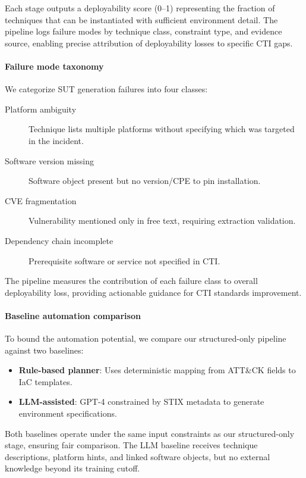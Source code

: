 \documentclass[sigconf,anonymous,review]{acmart}
\begin{document}
Each stage outputs a deployability score (0--1) representing the fraction of techniques that can be instantiated with sufficient environment detail. The pipeline logs failure modes by technique class, constraint type, and evidence source, enabling precise attribution of deployability losses to specific CTI gaps.

\paragraph{Failure mode taxonomy}

We categorize SUT generation failures into four classes:

\begin{description}
\item[Platform ambiguity] Technique lists multiple platforms without specifying which was targeted in the incident.
\item[Software version missing] Software object present but no version/CPE to pin installation.
\item[CVE fragmentation] Vulnerability mentioned only in free text, requiring extraction validation.
\item[Dependency chain incomplete] Prerequisite software or service not specified in CTI.
\end{description}

The pipeline measures the contribution of each failure class to overall deployability loss, providing actionable guidance for CTI standards improvement.

\paragraph{Baseline automation comparison}

To bound the automation potential, we compare our structured-only pipeline against two baselines:

\begin{itemize}
\item \textbf{Rule-based planner}: Uses deterministic mapping from ATT\&CK fields to IaC templates.
\item \textbf{LLM-assisted}: GPT-4 constrained by STIX metadata to generate environment specifications.
\end{itemize}

Both baselines operate under the same input constraints as our structured-only stage, ensuring fair comparison. The LLM baseline receives technique descriptions, platform hints, and linked software objects, but no external knowledge beyond its training cutoff.
\end{document}
